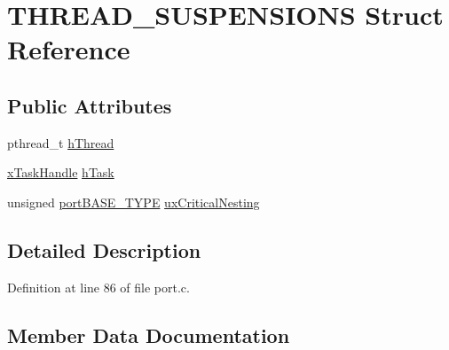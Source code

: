 \hypertarget{struct_t_h_r_e_a_d___s_u_s_p_e_n_s_i_o_n_s}{}\section{T\+H\+R\+E\+A\+D\+\_\+\+S\+U\+S\+P\+E\+N\+S\+I\+O\+NS Struct Reference}
\label{struct_t_h_r_e_a_d___s_u_s_p_e_n_s_i_o_n_s}
\subsection*{Public Attributes}
\begin{DoxyCompactItemize}
\item 
pthread\+\_\+t \hyperlink{struct_t_h_r_e_a_d___s_u_s_p_e_n_s_i_o_n_s_a0587fb38462eacbd840ab28a08cb084d}{h\+Thread}
\item 
\hyperlink{vendor_2ceedling_2plugins_2freertos_2vendor_2freertos_2include_2_free_r_t_o_s_8h_af7cd8f53b62f0c497b442b504c30f2ec}{x\+Task\+Handle} \hyperlink{struct_t_h_r_e_a_d___s_u_s_p_e_n_s_i_o_n_s_a6ace02b547a235d84affe319a0b29e74}{h\+Task}
\item 
unsigned \hyperlink{vendor_2ceedling_2plugins_2freertos_2vendor_2freertos_2portable_2_g_c_c_2_p_o_s_i_x_2portmacro_8h_a1ebe82d24d764ae4e352f7c3a9f92c01}{port\+B\+A\+S\+E\+\_\+\+T\+Y\+PE} \hyperlink{struct_t_h_r_e_a_d___s_u_s_p_e_n_s_i_o_n_s_a91b1dc4adc7949de7206346151c5b143}{ux\+Critical\+Nesting}
\end{DoxyCompactItemize}


\subsection{Detailed Description}


Definition at line 86 of file port.\+c.



\subsection{Member Data Documentation}
\mbox{\label{struct_t_h_r_e_a_d___s_u_s_p_e_n_s_i_o_n_s_a6ace02b547a235d84affe319a0b29e74}} 
